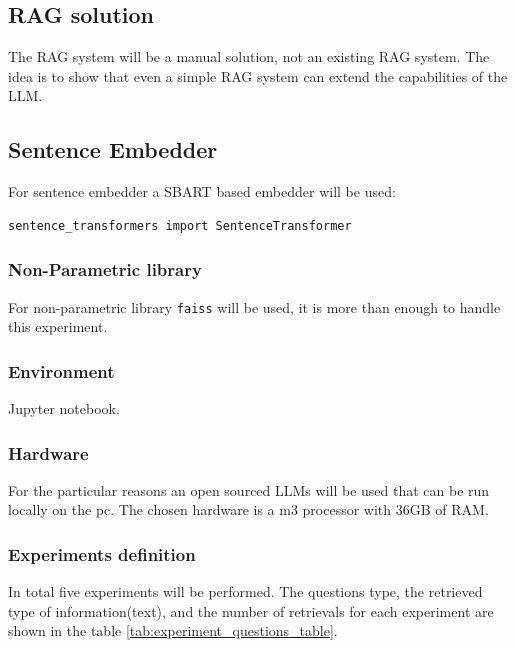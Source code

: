 \documentclass{wseas}
\begin{document}
\newpage

\subsection{RAG solution}

The RAG system will be a manual solution, not an existing RAG system.
The idea is to show that even a simple RAG system can extend the
capabilities of the LLM.

\subsection{Sentence Embedder}

For sentence embedder a SBART based embedder will be used:

\begin{verbatim}
sentence_transformers import SentenceTransformer
\end{verbatim}

\subsubsection{Non-Parametric library}

For non-parametric library \texttt{faiss} will be used, it is more than
enough to handle this experiment.

\subsubsection{Environment}

Jupyter notebook.

\subsubsection{Hardware}

For the particular reasons an open sourced LLMs will be used that can be
run locally on the pc. The chosen hardware is a m3 processor with 36GB
of RAM.

\subsubsection{Experiments definition}

In total five experiments will be performed. The questions type, the retrieved type of information(text), 
and the number of retrievals for each experiment are shown in the table \ref{tab:experiment_questions_table}. 
\end{document}
